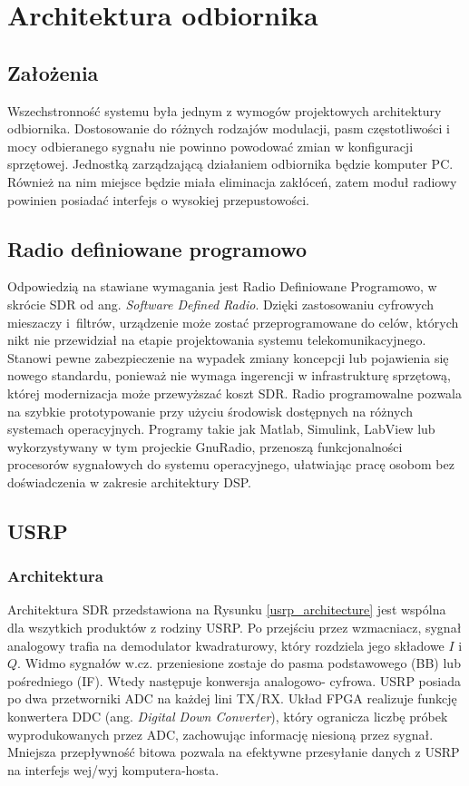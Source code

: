 \chapter{Architektura odbiornika}

\section{Założenia}
Wszechstronność systemu była jednym z wymogów projektowych architektury odbiornika. 
Dostosowanie do różnych rodzajów modulacji, pasm częstotliwości i mocy odbieranego sygnału nie powinno powodować zmian w konfiguracji sprzętowej.
Jednostką zarządzającą działaniem odbiornika będzie komputer PC.
Również na nim miejsce będzie miała eliminacja zakłóceń, zatem moduł radiowy powinien posiadać interfejs o wysokiej przepustowości.

\section{Radio definiowane programowo}
Odpowiedzią na stawiane wymagania jest Radio Definiowane Programowo, w skrócie SDR od ang. \textit{Software Defined Radio}.
Dzięki zastosowaniu cyfrowych mieszaczy i~filtrów, urządzenie może zostać przeprogramowane do celów, których nikt nie przewidział na etapie projektowania systemu telekomunikacyjnego.
Stanowi pewne zabezpieczenie na wypadek zmiany koncepcji lub pojawienia się nowego standardu, ponieważ nie wymaga ingerencji w infrastrukturę sprzętową, której modernizacja może przewyższać koszt SDR.
Radio programowalne pozwala na szybkie prototypowanie przy użyciu środowisk dostępnych na różnych systemach operacyjnych. 
Programy takie jak Matlab, Simulink, LabView lub wykorzystywany w tym projeckie GnuRadio, przenoszą funkcjonalności procesorów sygnałowych do systemu operacyjnego, ułatwiając pracę osobom bez doświadczenia w zakresie architektury DSP.~\cite{ImplementingSDR:92304} 

\section{USRP}
\subsection{Architektura}
Architektura SDR przedstawiona na Rysunku \ref{usrp_architecture} jest wspólna dla wszytkich produktów z rodziny USRP. Po przejściu przez wzmacniacz, sygnał analogowy trafia na demodulator kwadraturowy, który rozdziela jego składowe $I$ i $Q$. 
Widmo sygnałów w.cz. przeniesione zostaje do pasma podstawowego (BB) lub pośredniego (IF). 
Wtedy następuje konwersja analogowo- cyfrowa. 
USRP posiada po dwa przetworniki ADC na każdej lini TX/RX.
Układ FPGA realizuje funkcję konwertera DDC (ang. \textit{Digital Down Converter}), który ogranicza liczbę próbek wyprodukowanych przez ADC, zachowując informację niesioną przez sygnał.
Mniejsza przepływność bitowa pozwala na efektywne przesyłanie danych z USRP na interfejs wej/wyj komputera-hosta. \cite{usrp_bw}

